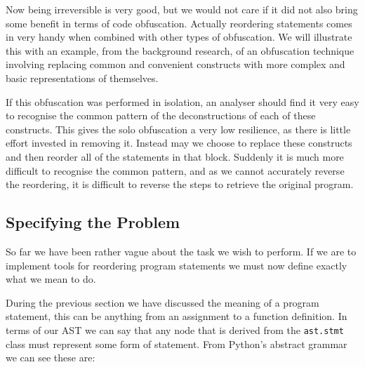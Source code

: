 \documentclass[twoside,a4paper]{report}
\begin{document}
Now being irreversible is very good, but we would not care if it did not also bring some benefit in terms of code obfuscation. Actually
reordering statements comes in very handy when combined with other types of obfuscation. We will illustrate this with an example, from the background
research, of an obfuscation technique involving replacing common and convenient constructs with more complex and basic representations of themselves.

If this obfuscation was performed in isolation, an analyser should find it very easy to recognise the common pattern of the deconstructions of each of these
constructs. This gives the solo obfuscation a very low resilience, as there is little effort invested in removing it. Instead may we choose to replace
these constructs and then reorder all of the statements in that block. Suddenly it is much more difficult to recognise the common pattern, and as we cannot
accurately reverse the reordering, it is difficult to reverse the steps to retrieve the original program.

\subsection{Specifying the Problem}

So far we have been rather vague about the task we wish to perform. If we are to implement tools for reordering program statements we must now
define exactly what we mean to do.

During the previous section we have discussed the meaning of a program statement, this can be anything from an assignment to a function definition.
In terms of our AST we can say that any node that is derived from the \texttt{ast.stmt} class must represent some form of statement. From Python's
abstract grammar \cite{pyagrammar} we can see these are:
\end{document}
